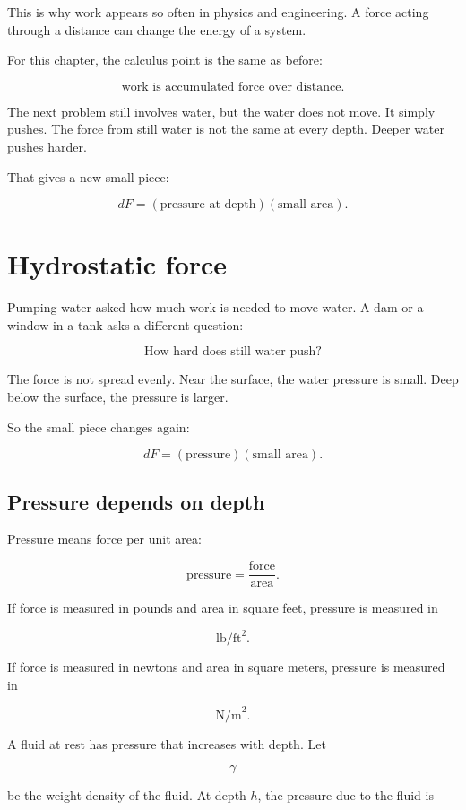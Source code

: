 This is why work appears so often in physics and engineering.  A force acting through a
distance can change the energy of a system.

For this chapter, the calculus point is the same as before:

\[
\boxed{
\text{work is accumulated force over distance.}
}
\]

The next problem still involves water, but the water does not move.  It simply pushes.
The force from still water is not the same at every depth.  Deeper water pushes harder.

That gives a new small piece:

\[
dF=(\text{pressure at depth})(\text{small area}).
\]

\section{Hydrostatic force}
\label{sec:hydrostatic-force}

Pumping water asked how much work is needed to move water.  A dam or a window in
a tank asks a different question:

\[
\text{How hard does still water push?}
\]

The force is not spread evenly.  Near the surface, the water pressure is small.  Deep below
the surface, the pressure is larger.

So the small piece changes again:

\[
dF=(\text{pressure})(\text{small area}).
\]

\subsection{Pressure depends on depth}
\label{subsec:pressure-depth}

Pressure means force per unit area:

\[
\text{pressure}=\frac{\text{force}}{\text{area}}.
\]

If force is measured in pounds and area in square feet, pressure is measured in

\[
\text{lb/ft}^2.
\]

If force is measured in newtons and area in square meters, pressure is measured in

\[
\text{N/m}^2.
\]

A fluid at rest has pressure that increases with depth.  Let

\[
\gamma
\]

be the weight density of the fluid.  At depth \(h\), the pressure due to the fluid is


